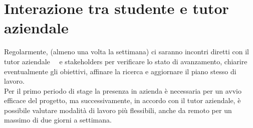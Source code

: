 \section{Interazione tra studente e tutor aziendale}

Regolarmente, (almeno una volta la settimana) ci saranno incontri diretti con il tutor aziendale \nomeTutorAziendale\ \cognomeTutorAziendale\ e stakeholders per verificare lo stato di avanzamento, chiarire eventualmente gli obiettivi, affinare la ricerca e aggiornare il piano stesso di lavoro.\\
Per il primo periodo di stage la presenza in azienda è necessaria per un avvio efficace del progetto, ma successivamente, in accordo con il tutor aziendale, è possibile valutare modalità di lavoro più flessibili, anche da remoto per un massimo di due giorni a settimana.\\